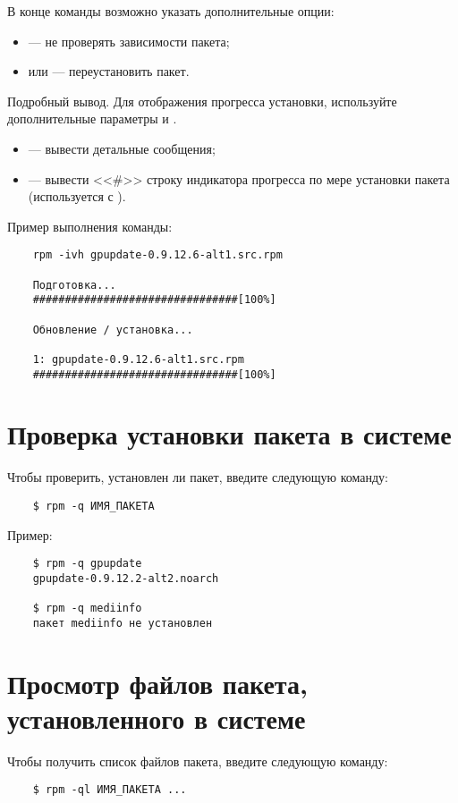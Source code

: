 В конце команды возможно указать дополнительные опции: 
\begin{itemize}
	\item {} --- не проверять зависимости пакета;
	\item {} или  --- переустановить пакет.
\end{itemize}

Подробный вывод.
Для отображения прогресса установки, используйте дополнительные параметры  и .
\begin{itemize}
	\item {} --- вывести детальные сообщения;
	\item {} --- вывести <<\#>> строку индикатора прогресса по мере установки пакета (используется с ).
\end{itemize}

Пример выполнения команды:
\begin{verbatim}
	rpm -ivh gpupdate-0.9.12.6-alt1.src.rpm
	
	Подготовка...
	################################[100%]
	
	Обновление / установка...
	
	1: gpupdate-0.9.12.6-alt1.src.rpm 
	################################[100%] 
\end{verbatim}


\section{Проверка установки пакета в системе}\label{verifying-package}
Чтобы проверить, установлен ли пакет, введите следующую команду: 
\begin{verbatim}
	$ rpm -q ИМЯ_ПАКЕТА 
\end{verbatim}

Пример: 
\begin{verbatim}
	$ rpm -q gpupdate
	gpupdate-0.9.12.2-alt2.noarch
	
	$ rpm -q mediinfo
	пакет mediinfo не установлен
\end{verbatim}

\section{Просмотр файлов пакета, установленного в системе}
Чтобы получить список файлов пакета, введите следующую команду:
\begin{verbatim}
	$ rpm -ql ИМЯ_ПАКЕТА ...
\end{verbatim}


